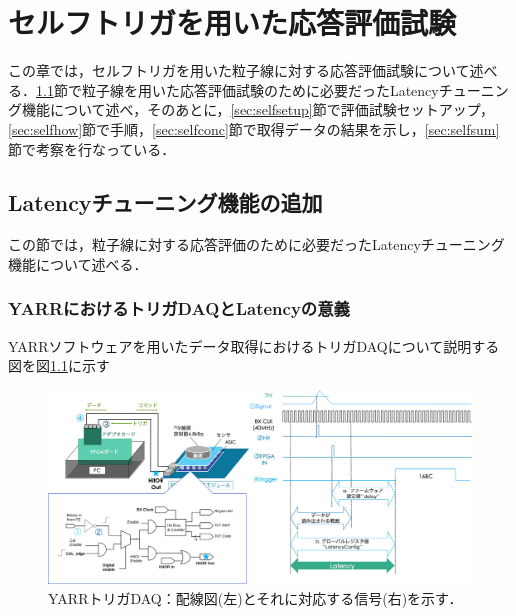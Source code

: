 \chapter{セルフトリガを用いた応答評価試験}
この章では，セルフトリガを用いた粒子線に対する応答評価試験について述べる．\ref{sec:latency}節で粒子線を用いた応答評価試験のために必要だったLatencyチューニング機能について述べ，そのあとに，\ref{sec:selfsetup}節で評価試験セットアップ，\ref{sec:selfhow}節で手順，\ref{sec:selfconc}節で取得データの結果を示し，\ref{sec:selfsum}節で考察を行なっている．

\section{Latencyチューニング機能の追加}
\label{sec:latency}
この節では，粒子線に対する応答評価のために必要だったLatencyチューニング機能について述べる．
\subsection{YARRにおけるトリガDAQとLatencyの意義}
YARRソフトウェアを用いたデータ取得におけるトリガDAQについて説明する図を図\ref{fig:YARRDAQ}に示す\par
\begin{figure}[h]
  \centering
  \includegraphics[width=16cm]{./figure/DAQ_sigfig.png}
  \caption{YARRトリガDAQ：配線図(左)とそれに対応する信号(右)を示す．}
  \label{fig:YARRDAQ}
\end{figure}

